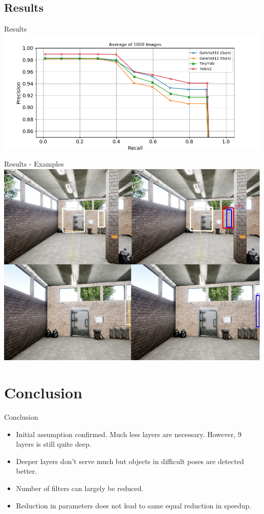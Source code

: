 \documentclass{beamer}
\begin{document}
\begin{darkframes}
    \subsection{Results}
    \begin{frame}{Results}
    	\includegraphics[width=\textwidth]{fig/pr}
    \end{frame}

    \begin{frame}{Results - Examples}
    	\includegraphics[width=\textwidth]{fig/examples}
	\end{frame}
    
    \section{Conclusion}
    \begin{frame}{Conclusion}

    \begin{itemize}
    	\item Initial assumption confirmed. Much less layers are necessary. However, 9 layers is still quite deep.
    	\item Deeper layers don't serve much but objects in difficult poses are detected better.
    	\item Number of filters can largely be reduced.
    	\item Reduction in parameters does not lead to same equal reduction in speedup.
    \end{itemize}
    \end{frame}


\end{darkframes}
\end{document}
